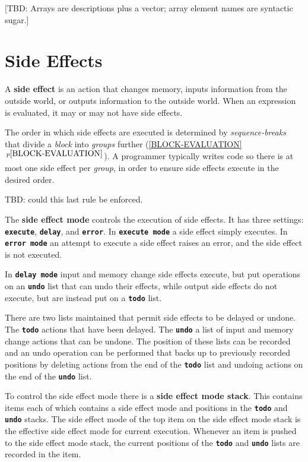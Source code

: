 \documentclass[12pt]{article}
\newcommand{\TT}[1]{{\tt \bfseries #1}}
\newcommand{\key}[1]{{\rm \bfseries #1}}
\newcommand{\ttkey}[1]{{\tt \bfseries #1}}
\newcommand{\itemref}[1]{\ref{#1}$\,^{p\pageref{#1}}$}
\begin{document}
[TBD: Arrays are descriptions plus a vector;
array element names are syntactic sugar.]

\section{Side Effects}
\label{SIDE-EFFECTS}

A \key{side effect} is an action that changes memory, inputs information from
the outside world, or outputs information to the outside world.
When an expression is evaluated, it may or may not have side effects.

The order in which side effects are executed is determined by
{\em sequence-breaks} that divide a {\em block} into {\em groups}
further (\itemref{BLOCK-EVALUATION}).  A programmer typically writes code
so there is at most one side effect per {\em group}, in order to
ensure side effects execute in the desired order.

TBD: could this last rule be enforced.

The \key{side effect mode} controls the execution of side effects.
It has three settings: \TT{execute}, \TT{delay}, and \TT{error}.
In \ttkey{execute mode} a side effect simply executes.  In
\ttkey{error mode} an attempt to execute a side effect raises an error,
and the side effect is not executed.

In \ttkey{delay mode} input and memory change side effects execute,
but put operations on an \TT{undo} list that can undo their effects,
while output side effects do not execute, but are instead put on a
\TT{todo} list.

There are two lists maintained that permit side effects to be delayed
or undone.  The \ttkey{todo}
actions that have been delayed.  The \ttkey{undo}
a list of input and memory change actions that can be undone.
The position of these lists can be recorded and an undo
operation can be performed that backs up to previously recorded positions
by deleting actions from the end of the \TT{todo} list and undoing
actions on the end of the \TT{undo} list.

To control the side effect mode there is a \key{side effect mode stack}.
This contains items each of which contains a side effect mode and
positions in the \TT{todo} and \TT{undo} stacks.  The side effect mode
of the top item on the side effect mode stack is the effective side
effect mode for current execution.
Whenever an item is pushed to the side effect mode stack, the current
positions of the \TT{todo} and \TT{undo} lists are recorded in the
item.
\end{document}
